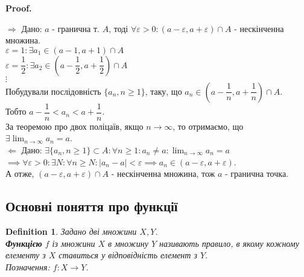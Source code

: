\documentclass[a4paper, 14pt]{article}
\makeatletter
\def\huge{\displaystyle}
\def\qed{$\blacksquare$}
\def\rightproof{$\boxed{\Rightarrow}$ }
\def\leftproof{$\boxed{\Leftarrow}$ }
\theoremstyle{theoremdd}
\theoremstyle{theoremdd}
\newtheorem{definition}[theorem]{Definition}
\theoremstyle{theoremdd}
\theoremstyle{theoremdd}
\theoremstyle{theoremdd}
\theoremstyle{theoremdd}
\theoremstyle{theoremdd}
\theoremstyle{theoremdd}
\renewenvironment{proof}[1][Proof.\\]{\par
\pushQED{\hfill \qed}%
\normalfont \topsep6\p@\@plus6\p@\relax
\trivlist
\item\relax
{\bfseries
#1\@addpunct{.}}\hspace\labelsep\ignorespaces
}{%
\popQED\endtrivlist\@endpefalse
}
\makeatother
\begin{document}
	\begin{proof}
	\rightproof Дано: $a$ - гранична т. $A$, тоді $\forall \varepsilon > 0: (a-\varepsilon, a + \varepsilon) \cap A$ - нескінченна множина.\\
	$\varepsilon = 1: \exists a_1 \in (a-1,a+1) \cap A$\\
	$\varepsilon = \dfrac{1}{2}: \exists a_2 \in (a-\dfrac{1}{2}, a+\dfrac{1}{2}) \cap A$\\
	$\vdots$\\
	Побудували послідовність $\{a_n, n \geq 1\}$, таку, що $a_n \in (a-\dfrac{1}{n}, a+\dfrac{1}{n}) \cap A$.\\
	Тобто $a - \dfrac{1}{n} < a_n < a + \dfrac{1}{n}$.\\
	За теоремою про двох поліцаїв, якщо $n \to \infty$, то отримаємо, що $\exists \huge \lim_{n \to \infty} a_n = a$.
	\bigskip \\
	
	\leftproof Дано: $\exists \{a_n, n \geq 1\} \subset A: \forall n \geq 1: a_n \neq a: \huge \lim_{n \to \infty} a_n = a$\\
	$\implies \forall \varepsilon > 0: \exists N: \forall n \geq N: |a_n-a|<\varepsilon \implies a_n \in (a-\varepsilon,a+\varepsilon)$.\\
	А отже, $(a-\varepsilon,a+\varepsilon) \cap A$ - нескінченна множина, тож $a$ - гранична точка.
\end{proof}
	\subsection{Основні поняття про функції}
	\begin{definition}
	Задано дві множини $X,Y$.\\
	\textbf{Функцією} $f$ із множини $X$ в множину $Y$ називають правило, в якому кожному елементу з $X$ ставиться у відповідність елемент з $Y$.\\
	Позначення: $f: X \to Y$.
	\begin{figure}[H]
\end{figure}
	\end{definition}
	
\end{document}
